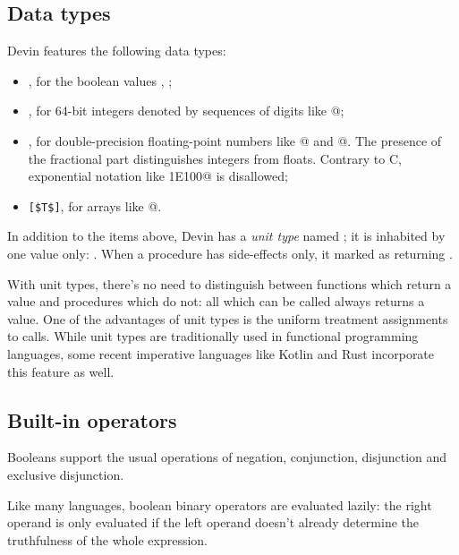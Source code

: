 \documentclass[UdineBachThesis,american,11pt]{PhdThesis}
\begin{document}
  \subsection{Data types}

  Devin features the following data types:

  \begin{itemize}
    \item \lstinline@Bool@, for the boolean values \lstinline@true@,
    \lstinline@false@;

    \item \lstinline@Int@, for 64-bit integers denoted by sequences of digits
    like @;

    \item \lstinline@Float@, for double-precision floating-point numbers like
    @ and @. The presence of the fractional part
    distinguishes integers from floats. Contrary to C, exponential notation like
    \lstinline@1E100@ is disallowed;

    \item \lstinline[mathescape]@[$T$]@, for arrays like
    \lstinline@[1, 1, 2, 3, 5, 8, 13, 21, 34, 55]@.
  \end{itemize}

  In addition to the items above, Devin has a \emph{unit type} named
  \lstinline@Unit@; it is inhabited by one value only: \lstinline@unit@. When a
  procedure has side-effects only, it marked as returning \lstinline@Unit@.

  With unit types, there's no need to distinguish between functions which return
  a value and procedures which do not: all which can be called always returns a
  value. One of the advantages of unit types is the uniform treatment
  assignments to calls. While unit types are traditionally used in functional
  programming languages, some recent imperative languages like Kotlin and Rust
  incorporate this feature as well.

  \subsection{Built-in operators}

  Booleans support the usual operations of negation, conjunction, disjunction
  and exclusive disjunction.

  Like many languages, boolean binary operators are evaluated lazily: the right
  operand is only evaluated if the left operand doesn't already determine the
  truthfulness of the whole expression.
\end{document}
